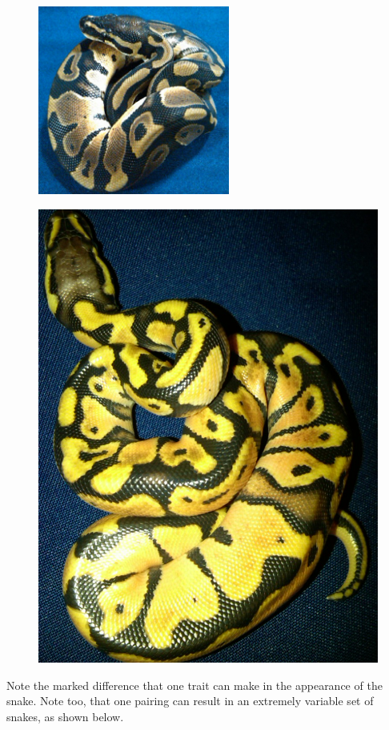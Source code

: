 \documentclass{article}
\begin{document}
	\begin{multicols}{2}
	\begin{figure}[H]
	\centering
	\includegraphics[width=.5\textwidth, height = 62mm]{Normal.jpg}
	\end{figure}
	\begin{figure}[H]
	\centering
	\includegraphics[width=.5\textwidth]{Pastel.jpg}
	\end{figure}
	\end{multicols}
	Note the marked difference that one trait can make in the appearance of the snake. Note too, that one pairing can result in an extremely variable set of snakes, as shown below.
\end{document}
